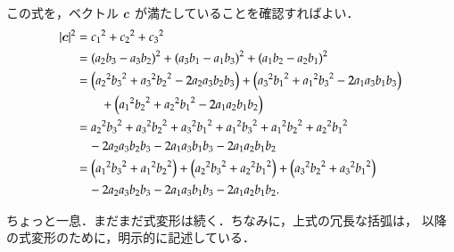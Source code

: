                 この式を，ベクトル $\boldsymbol{c}$ が満たしていることを確認すればよい．
                    \begin{align*}
                        |\boldsymbol{c}|^{2}
                        &=
                        {c_{1}}^{2}+{c_{2}}^{2}+{c_{3}}^{2} \\
                        &=
                         {(a_{2}b_{3} - a_{3}b_{2})}^{2}
                         + {(a_{3}b_{1} - a_{1}b_{3})}^{2}
                         + {(a_{1}b_{2} - a_{2}b_{1})}^{2} \\
                        &=
                        \left(
                            {a_{2}}^{2}{b_{3}}^{2} + {a_{3}}^{2}{b_{2}}^{2} - 2a_{2}a_{3}b_{2}b_{3}
                        \right)
                        + \left(
                            {a_{3}}^{2}{b_{1}}^{2} + {a_{1}}^{2}{b_{3}}^{2} - 2a_{1}a_{3}b_{1}b_{3}
                        \right) \\ &\qquad
                        + \left(
                            {a_{1}}^{2}{b_{2}}^{2} + {a_{2}}^{2}{b_{1}}^{2} - 2a_{1}a_{2}b_{1}b_{2}
                        \right) \\
                        &=
                          {a_{2}}^{2}{b_{3}}^{2} + {a_{3}}^{2}{b_{2}}^{2} + {a_{3}}^{2}{b_{1}}^{2}
                        + {a_{1}}^{2}{b_{3}}^{2} + {a_{1}}^{2}{b_{2}}^{2} + {a_{2}}^{2}{b_{1}}^{2} \\
                        &\quad - 2a_{2}a_{3}b_{2}b_{3} - 2a_{1}a_{3}b_{1}b_{3} - 2a_{1}a_{2}b_{1}b_{2} \\
                        &=
                          \left({a_{1}}^{2}{b_{3}}^{2} + {a_{1}}^{2}{b_{2}}^{2}\right)
                        + \left({a_{2}}^{2}{b_{3}}^{2} + {a_{2}}^{2}{b_{1}}^{2}\right)
                        + \left({a_{3}}^{2}{b_{2}}^{2} + {a_{3}}^{2}{b_{1}}^{2}\right) \\
                        &\quad - 2a_{2}a_{3}b_{2}b_{3} - 2a_{1}a_{3}b_{1}b_{3} - 2a_{1}a_{2}b_{1}b_{2}.
                    \end{align*}

                ちょっと一息．まだまだ式変形は続く．ちなみに，上式の冗長な括弧は，
                以降の式変形のために，明示的に記述している．

